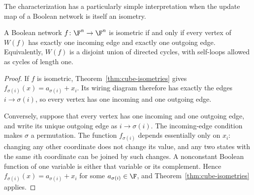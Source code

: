 The characterization has a particularly simple interpretation when the update map of a Boolean network is itself an isometry.

\begin{corollary}\label{cor:isometric-network}
    A Boolean network $f\colon\F^n\to\F^n$ is isometric if and only if every vertex of $W(f)$ has exactly one incoming edge and exactly one outgoing edge. Equivalently, $W(f)$ is a disjoint union of directed cycles, with self-loops allowed as cycles of length one.
\end{corollary}

\begin{proof}
    If $f$ is isometric, Theorem~\ref{thm:cube-isometries} gives
    $f_{\sigma(i)}(x)=a_{\sigma(i)}+ x_i$. Its wiring diagram therefore has exactly the edges $i\longrightarrow\sigma(i)$, so every vertex has one incoming and one outgoing edge.

    Conversely, suppose that every vertex has one incoming and one outgoing edge, and write its unique outgoing edge as $i\longrightarrow\sigma(i)$. The incoming-edge condition makes $\sigma$ a permutation. The function $f_{\sigma(i)}$ depends essentially only on $x_i$: changing any other coordinate does not change its value, and any two states with the same $i$th coordinate can be joined by such changes. A nonconstant Boolean function of one variable is either that variable or its complement. Hence
    $f_{\sigma(i)}(x)=a_{\sigma(i)}+ x_i$ for some $a_{\sigma(i)}\in\F$, and Theorem~\ref{thm:cube-isometries} applies.
\end{proof}

